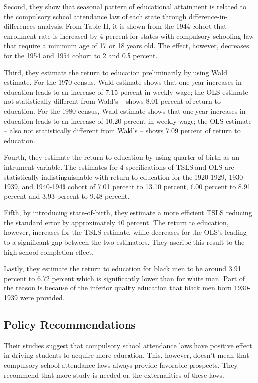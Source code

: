 \documentclass{article}
\begin{document}
Second, they show that seasonal pattern of educational attainment is related to the compulsory school attendance law of each state through difference-in-differences analysis. From Table II, it is shown from the 1944 cohort that enrollment rate is increased by 4 percent for states with compulsory schooling law that require a minimum age of 17 or 18 years old. The effect, however, decreases for the 1954 and 1964 cohort to 2 and 0.5 percent. 

Third, they estimate the return to education preliminarily by using Wald estimate. For the 1970 census, Wald estimate shows that one year increases in education leads to an increase of 7.15 percent in weekly wage; the OLS estimate -- not statistically different from Wald's -- shows 8.01 percent of return to education. For the 1980 census, Wald estimate shows that one year increases in education leads to an increase of 10.20 percent in weekly wage; the OLS estimate -- also not statistically different from Wald's -- shows 7.09 percent of return to education. 

Fourth, they estimate the return to education by using quarter-of-birth as an intrument variable. The estimates for 4 specifications of TSLS and OLS are statistically indistinguishable with return to education for the 1920-1929, 1930-1939, and 1940-1949 cohort of 7.01 percent to 13.10 percent, 6.00 percent to 8.91 percent and 3.93 percent to 9.48 percent.

Fifth, by introducing state-of-birth, they estimate a more efficient TSLS reducing the standard error by approximately 40 percent. The return to education, however, increases for the TSLS estimate, while decreases for the OLS's leading to a significant gap between the two estimators. They ascribe this result to the high school completion effect.

Lastly, they estimate the return to education for black men to be around 3.91 percent to 6.72 percent which is significantly lower than for white man. Part of the reason is because of the inferior quality education that black men born 1930-1939 were provided.

\subsection{Policy Recommendations}
Their studies suggest that compulsory school attendance laws have positive effect in driving students to acquire more education. This, however, doesn't mean that compulsory school attendance laws always provide favorable prospects. They recommend that more study is needed on the externalities of these laws.
\end{document}
